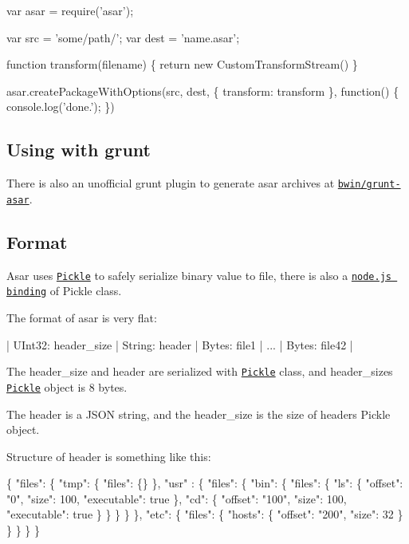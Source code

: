 \begin{DoxyCode}
var asar = require('asar');

var src = 'some/path/';
var dest = 'name.asar';

function transform(filename) \{
  return new CustomTransformStream()
\}

asar.createPackageWithOptions(src, dest, \{ transform: transform \}, function() \{
  console.log('done.');
\})
\end{DoxyCode}


\subsection*{Using with grunt}

There is also an unofficial grunt plugin to generate asar archives at \href{https://github.com/bwin/grunt-asar}{\tt bwin/grunt-\/asar}.

\subsection*{Format}

Asar uses \href{https://chromium.googlesource.com/chromium/src/+/master/base/pickle.h}{\tt Pickle} to safely serialize binary value to file, there is also a \href{https://www.npmjs.org/package/chromium-pickle}{\tt node.\+js binding} of {\ttfamily Pickle} class.

The format of asar is very flat\+:


\begin{DoxyCode}
| UInt32: header\_size | String: header | Bytes: file1 | ... | Bytes: file42 |
\end{DoxyCode}


The {\ttfamily header\+\_\+size} and {\ttfamily header} are serialized with \href{https://chromium.googlesource.com/chromium/src/+/master/base/pickle.h}{\tt Pickle} class, and {\ttfamily header\+\_\+size}\textquotesingle{}s \href{https://chromium.googlesource.com/chromium/src/+/master/base/pickle.h}{\tt Pickle} object is 8 bytes.

The {\ttfamily header} is a J\+S\+ON string, and the {\ttfamily header\+\_\+size} is the size of {\ttfamily header}\textquotesingle{}s {\ttfamily Pickle} object.

Structure of {\ttfamily header} is something like this\+:


\begin{DoxyCode}
\{
   "files": \{
      "tmp": \{
         "files": \{\}
      \},
      "usr" : \{
         "files": \{
           "bin": \{
             "files": \{
               "ls": \{
                 "offset": "0",
                 "size": 100,
                 "executable": true
               \},
               "cd": \{
                 "offset": "100",
                 "size": 100,
                 "executable": true
               \}
             \}
           \}
         \}
      \},
      "etc": \{
         "files": \{
           "hosts": \{
             "offset": "200",
             "size": 32
           \}
         \}
      \}
   \}
\}
\end{DoxyCode}


